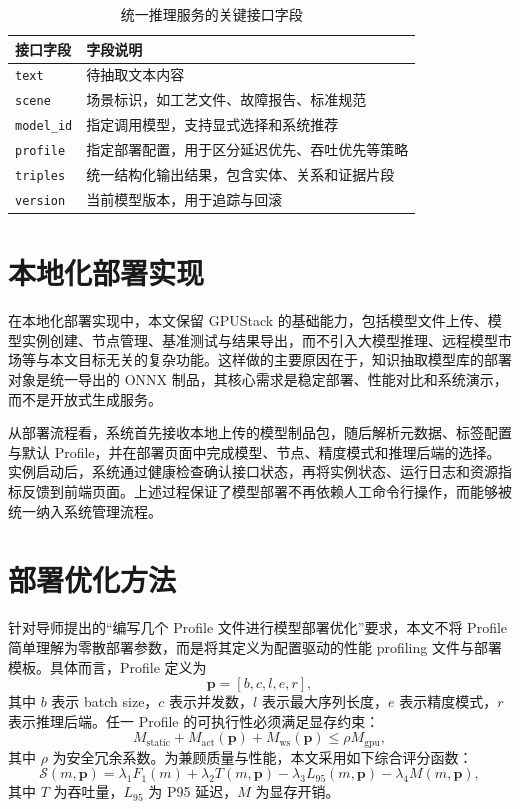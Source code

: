 \begin{table}[htbp]
  \centering
  \caption{统一推理服务的关键接口字段}
  \vspace{0.5em}\wuhao
  \begin{tabularx}{\textwidth}{l X}
    \toprule
    接口字段 & 字段说明 \\
    \midrule
    \texttt{text} & 待抽取文本内容 \\
    \texttt{scene} & 场景标识，如工艺文件、故障报告、标准规范 \\
    \texttt{model\_id} & 指定调用模型，支持显式选择和系统推荐 \\
    \texttt{profile} & 指定部署配置，用于区分延迟优先、吞吐优先等策略 \\
    \texttt{triples} & 统一结构化输出结果，包含实体、关系和证据片段 \\
    \texttt{version} & 当前模型版本，用于追踪与回滚 \\
    \bottomrule
  \end{tabularx}
\label{tab:service_schema_compact}
\end{table}

\section{本地化部署实现}
在本地化部署实现中，本文保留 GPUStack 的基础能力，包括模型文件上传、模型实例创建、节点管理、基准测试与结果导出，而不引入大模型推理、远程模型市场等与本文目标无关的复杂功能。这样做的主要原因在于，知识抽取模型库的部署对象是统一导出的 ONNX 制品，其核心需求是稳定部署、性能对比和系统演示，而不是开放式生成服务。

从部署流程看，系统首先接收本地上传的模型制品包，随后解析元数据、标签配置与默认 Profile，并在部署页面中完成模型、节点、精度模式和推理后端的选择。实例启动后，系统通过健康检查确认接口状态，再将实例状态、运行日志和资源指标反馈到前端页面。上述过程保证了模型部署不再依赖人工命令行操作，而能够被统一纳入系统管理流程。

\section{部署优化方法}
针对导师提出的“编写几个 Profile 文件进行模型部署优化”要求，本文不将 Profile 简单理解为零散部署参数，而是将其定义为配置驱动的性能 profiling 文件与部署模板。具体而言，Profile 定义为
\begin{equation}
\mathbf{p}=[b,c,l,e,r],
\label{eq:profile_compact}
\end{equation}
其中 $b$ 表示 batch size，$c$ 表示并发数，$l$ 表示最大序列长度，$e$ 表示精度模式，$r$ 表示推理后端。任一 Profile 的可执行性必须满足显存约束：
\begin{equation}
M_{\text{static}}+M_{\text{act}}(\mathbf{p})+M_{\text{ws}}(\mathbf{p}) \leq \rho M_{\text{gpu}},
\label{eq:profile_memory_compact}
\end{equation}
其中 $\rho$ 为安全冗余系数。为兼顾质量与性能，本文采用如下综合评分函数：
\begin{equation}
\mathcal{S}(m,\mathbf{p})=\lambda_1 F_1(m)+\lambda_2 T(m,\mathbf{p})-\lambda_3 L_{95}(m,\mathbf{p})-\lambda_4 M(m,\mathbf{p}),
\label{eq:profile_score_compact}
\end{equation}
其中 $T$ 为吞吐量，$L_{95}$ 为 P95 延迟，$M$ 为显存开销。

